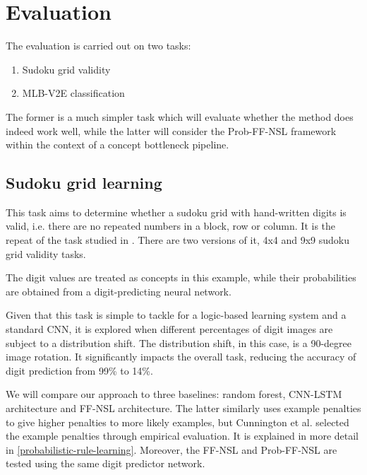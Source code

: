 \section{Evaluation}

The evaluation is carried out on two tasks: 
\begin{enumerate}
    \item Sudoku grid validity
    \item MLB-V2E classification
\end{enumerate}

The former is a much simpler task which will evaluate whether the method does indeed work well, while the latter will consider the Prob-FF-NSL framework within the context of a concept bottleneck pipeline.

\subsection{Sudoku grid learning}
\label{sudoku-grid-learning}

This task aims to determine whether a sudoku grid with hand-written digits is valid, i.e. there are no repeated numbers in a block, row or column.
It is the repeat of the task studied in \cite{RefWorks:RefID:71-cunnington2021ff-nsl:}.
There are two versions of it, 4x4 and 9x9 sudoku grid validity tasks.

The digit values are treated as concepts in this example, while their probabilities are obtained from a digit-predicting neural network.

Given that this task is simple to tackle for a logic-based learning system and a standard CNN, it is explored when different percentages of digit images are subject to a distribution shift.
The distribution shift, in this case, is a 90-degree image rotation.
It significantly impacts the overall task, reducing the accuracy of digit prediction from 99\% to 14\%.

We will compare our approach to three baselines: random forest, CNN-LSTM architecture and FF-NSL architecture. 
The latter similarly uses example penalties to give higher penalties to more likely examples, but Cunnington et al. \cite{RefWorks:RefID:71-cunnington2021ff-nsl:} selected the example penalties through empirical evaluation.
It is explained in more detail in \ref{probabilistic-rule-learning}.
Moreover, the FF-NSL and Prob-FF-NSL are tested using the same digit predictor network.

